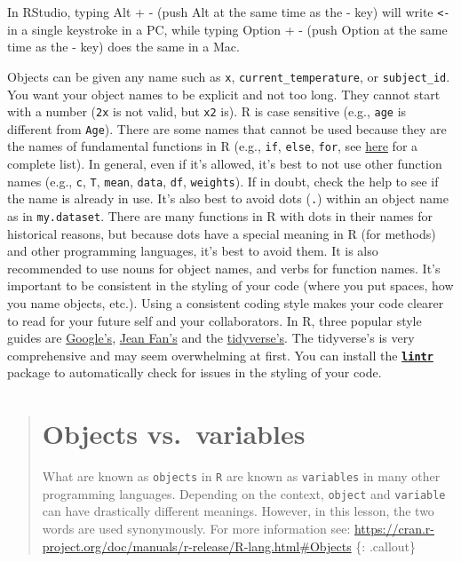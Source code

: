 \documentclass[]{book}
\begin{document}
In RStudio, typing Alt + - (push Alt at the same time as the - key) will
write \texttt{\textless{}-} in a single keystroke in a PC, while typing
Option + - (push Option at the same time as the - key) does the same in
a Mac.

Objects can be given any name such as \texttt{x},
\texttt{current\_temperature}, or \texttt{subject\_id}. You want your
object names to be explicit and not too long. They cannot start with a
number (\texttt{2x} is not valid, but \texttt{x2} is). R is case
sensitive (e.g., \texttt{age} is different from \texttt{Age}). There are
some names that cannot be used because they are the names of fundamental
functions in R (e.g., \texttt{if}, \texttt{else}, \texttt{for}, see
\href{https://stat.ethz.ch/R-manual/R-devel/library/base/html/Reserved.html}{here}
for a complete list). In general, even if it's allowed, it's best to not
use other function names (e.g., \texttt{c}, \texttt{T}, \texttt{mean},
\texttt{data}, \texttt{df}, \texttt{weights}). If in doubt, check the
help to see if the name is already in use. It's also best to avoid dots
(\texttt{.}) within an object name as in \texttt{my.dataset}. There are
many functions in R with dots in their names for historical reasons, but
because dots have a special meaning in R (for methods) and other
programming languages, it's best to avoid them. It is also recommended
to use nouns for object names, and verbs for function names. It's
important to be consistent in the styling of your code (where you put
spaces, how you name objects, etc.). Using a consistent coding style
makes your code clearer to read for your future self and your
collaborators. In R, three popular style guides are
\href{https://google.github.io/styleguide/Rguide.xml}{Google's},
\href{http://jef.works/R-style-guide/}{Jean Fan's} and the
\href{http://style.tidyverse.org/}{tidyverse's}. The tidyverse's is very
comprehensive and may seem overwhelming at first. You can install the
\href{https://github.com/jimhester/lintr}{\textbf{\texttt{lintr}}}
package to automatically check for issues in the styling of your code.

\begin{quote}
\section{Objects vs.~variables}\label{objects-vs.variables}

What are known as \texttt{objects} in \texttt{R} are known as
\texttt{variables} in many other programming languages. Depending on the
context, \texttt{object} and \texttt{variable} can have drastically
different meanings. However, in this lesson, the two words are used
synonymously. For more information see:
\url{https://cran.r-project.org/doc/manuals/r-release/R-lang.html\#Objects}
\{: .callout\}
\end{quote}
\end{document}
